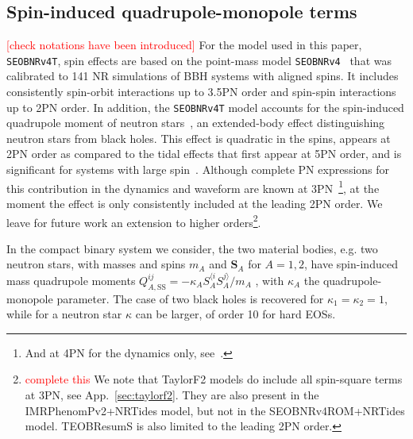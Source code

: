 \documentclass[prd,aps,letter,twocolumn,floatfix,notitlepage,nofootinbib]{revtex4-1}
\newcommand{\mr}{\mathrm}
\newcommand{\bs}{\boldsymbol}
\newcommand{\red}[1]{\textcolor{red}{#1}}
\begin{document}
\subsection{Spin-induced quadrupole-monopole terms}

\red{[check notations have been introduced]} For the model used in this paper, \texttt{SEOBNRv4T}, spin effects are based on the point-mass model \texttt{SEOBNRv4}~\cite{Bohe:2016gbl} that was calibrated to 141 NR simulations of BBH systems with aligned spins. It includes consistently spin-orbit interactions up to 3.5PN order and spin-spin interactions up to 2PN order. In addition, the \texttt{SEOBNRv4T} model accounts for the spin-induced quadrupole moment of neutron stars~\cite{Poisson1998}, an extended-body effect distinguishing neutron stars from black holes. This effect is quadratic in the spins, appears at 2PN order as compared to the tidal effects that first appear at 5PN order, and is significant for systems with large spin~\cite{HarryHinderer2018}. Although complete PN expressions for this contribution in the dynamics and waveform are known at 3PN~\cite{Bohe:2015ana}\footnote{And at 4PN for the dynamics only, see~\cite{}.}, at the moment the effect is only consistently included at the leading 2PN order. We leave for future work an extension to higher orders\footnote{\red{complete this} We note that TaylorF2 models do include all spin-square terms at 3PN, see App.~\ref{sec:taylorf2}. They are also present in the IMRPhenomPv2+NRTides model, but not in the SEOBNRv4ROM+NRTides model. TEOBResumS is also limited to the leading 2PN order.}.

In the compact binary system we consider, the two material bodies, e.g. two neutron stars, with masses and spins $m_{A}$ and $\bs{S}_{A}$ for $A=1,2$, have spin-induced mass quadrupole moments $Q_{A,\mr{SS}}^{ij}=-\kappa_A S_A^{\langle i}S_A^{j\rangle}/m_A$ \cite{Poisson1998}, with $\kappa_{A}$ the quadrupole-monopole parameter. The case of two black holes is recovered for $\kappa_1=\kappa_2=1$, while for a neutron star $\kappa$ can be larger, of order 10 for hard EOSs.
\end{document}
